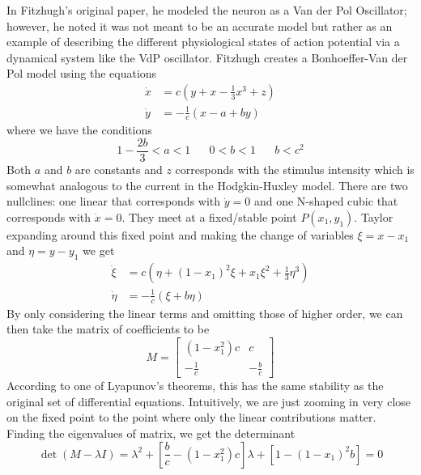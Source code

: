 \documentclass{article}
\newcommand{\twen}{\hspace{20pt}}
\numberwithin{equation}{section}
\begin{document}
In Fitzhugh's original paper, he modeled the neuron as a Van der Pol Oscillator; however, he noted it was not meant to be an accurate model but rather as an example of describing the different physiological states of action potential via a dynamical system like the VdP oscillator. Fitzhugh creates a Bonhoeffer-Van der Pol model using the equations 
\begin{equation}
\begin{split}
    \dot{x} &= c(y+x-\tfrac{1}{3}x^3+z) \\ 
    \dot{y} &= -\tfrac{1}{c} (x-a+by)
\end{split}
\end{equation}
where we have the conditions
\begin{equation}
    1-\frac{2b}{3} < a < 1 \twen 0 < b<1 \twen b<c^2
\end{equation}
Both $a$ and $b$ are constants and $z$ corresponds with the stimulus intensity which is somewhat analogous to the current in the Hodgkin-Huxley model. There are two nullclines: one linear that corresponds with $\dot{y}=0$ and one N-shaped cubic that corresponds with $\dot{x} = 0$. They meet at a fixed/stable point $P(x_1,y_1)$. Taylor expanding around this fixed point and making the change of variables $\xi=x-x_1$ and $\eta = y-y_1$ we get
\begin{equation}
\begin{split}
    \dot{\xi} &= c(\eta + (1-x_1)^2\xi +x_1\xi^2+\tfrac{1}{3}\eta^3) \\
    \dot{\eta} &= - \tfrac{1}{c}(\xi +b\eta) 
\end{split}
\end{equation}
By only considering the linear terms and omitting those of higher order, we can then take the matrix of coefficients to be 
\begin{equation}
    M= \begin{bmatrix}
        (1-x_1^2)c &c \\
        -\frac{1}{c} & -\frac{b}{c}
    \end{bmatrix}
\end{equation}
According to one of Lyapunov's theorems, this has the same stability as the original set of differential equations. Intuitively, we are just zooming in very close on the fixed point to the point where only the linear contributions matter. Finding the eigenvalues of matrix, we get the determinant
\begin{equation}
    \det(M-\lambda I) = \lambda^2 + \left[ \frac{b}{c} - (1-x_1^2)c \right]\lambda + [1-(1-x_1)^2b] = 0
\end{equation}
\end{document}
